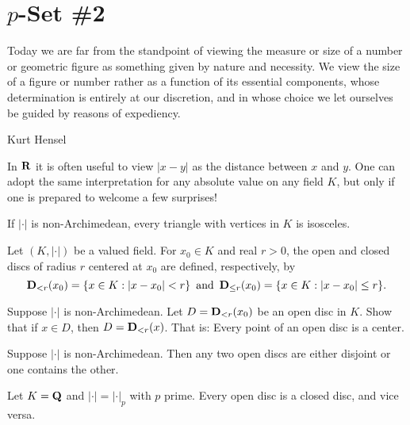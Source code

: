 %
%
%
\chapter*{$p$-Set \#2}

\dist

\epigraph{Today we are far from the standpoint of viewing the measure or size of a number or geometric figure as something given by nature and necessity. We view the size of a figure or number rather as a function of its essential components, whose determination is entirely at our discretion, and in whose choice we let ourselves be guided by reasons of expediency.
}{Kurt Hensel}

In $\mathbf{R}$ it is often useful to view $|x-y|$ as the distance between $x$ and $y$. One can adopt the same interpretation for any absolute value on any field $K$, but only if one is prepared to welcome a few surprises!

\begin{prob}\label{prob:12} If $|\cdot|$ is non-Archimedean, every triangle with vertices in $K$ is isosceles. 
\end{prob}

Let $(K,|\cdot|)$ be a valued field. For  $x_0 \in K$ and real $r > 0$, the \textsf{open} and \textsf{closed} \textsf{discs} of radius $r$ centered at $x_0$ are defined, respectively, by \[ \mathbf{D}_{<r}(x_0) = \{x \in K: |x-x_0| < r\}\,~\text{and}~\,\mathbf{D}_{\le r}(x_0) = \{x \in K: |x-x_0| \le r\}. \]

\begin{prob}\label{prob:13} Suppose $|\cdot|$ is non-Archimedean. Let $D = \mathbf{D}_{<r}(x_0)$ be an open disc in $K$. Show that if $x \in D$, then $D = \mathbf{D}_{<r}(x)$. That is: Every point of an open disc is a center. 
\end{prob}

\begin{prob}\label{prob:14} Suppose $|\cdot|$ is non-Archimedean. Then any two open discs are either disjoint or one contains the other.
\end{prob}

\begin{prob}\label{prob:15} Let $K=\mathbf{Q}$ and $|\cdot|=|\cdot|_p$ with $p$ prime. Every open disc is a closed disc, and vice versa.
\end{prob}

